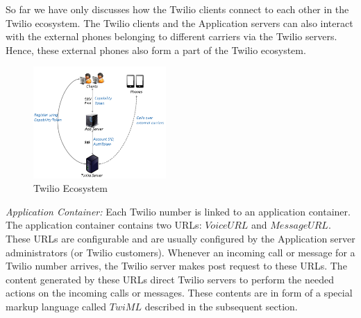 So far we have only discusses how the Twilio clients connect to each other in the Twilio ecosystem. The Twilio clients and the Application servers can also interact with the external phones belonging to different carriers via the Twilio servers. Hence, these external phones also form a part of the Twilio ecosystem.

\begin{figure}
\centering
  \centering
  \includegraphics[width=0.45\textwidth]{figs/Ecosystem.png}
\caption{Twilio Ecosystem}
\label{fig:ecosystem}
\end{figure}     

\emph{Application Container: } Each Twilio number is linked to an application container. The application container contains two URLs: $Voice URL$ and $Message URL$. These URLs are configurable and are usually configured by the Application server administrators (or Twilio customers). Whenever an incoming call or message for a Twilio number arrives, the Twilio server makes post request to these URLs. The content generated by these URLs direct Twilio servers to perform the needed actions on the incoming calls or messages. These contents are in form of a special markup language called $TwiML$ described in the subsequent section.

